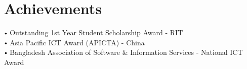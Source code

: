 \documentclass{article}
\makeatletter
\newcommand{\resumeItem}[1]{
  \item\small{
    {#1 \vspace{-2pt}}
  }
}
\newcommand{\resumeProjectHeading}[2]{
    \item
    \begin{tabular*}{0.97\textwidth}{l@{\extracolsep{\fill}}r}
      \small#1 & #2 \\
    \end{tabular*}\vspace{-7pt}
}
\renewcommand\labelitemii{$\vcenter{\hbox{\tiny$\bullet$}}$}
\newcommand{\resumeSubHeadingListStart}{\begin{itemize}[leftmargin=0.15in, label={}]}
\newcommand{\resumeItemListStart}{\begin{itemize}}
\newcommand{\resumeItemListEnd}{\end{itemize}\vspace{-5pt}}
\makeatother
\begin{document}
\section{Achievements}
\begin{itemize}[leftmargin=0.15in, label={}]
    \small{\item{
        \labelitemii{ Outstanding 1st Year Student Scholarship Award -}{ RIT} \\
        \labelitemii{ Asia Pacific ICT Award (APICTA) -}{ China} \\
        \labelitemii{ Bangladesh Association of Software & Information Services -}{ National ICT Award} \\
    }}
\end{itemize}
\vfill






\end{document}
